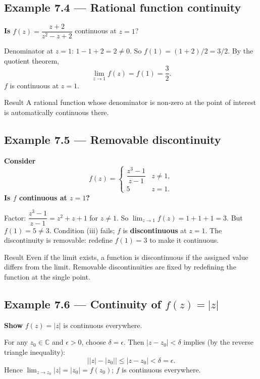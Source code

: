 \documentclass[12pt,a4paper]{article}
\begin{document}
\subsection*{Example 7.4 --- Rational function continuity}

\textbf{Is} $f(z) = \dfrac{z+2}{z^2 - z + 2}$ continuous at $z = 1$?

Denominator at $z = 1$: $1 - 1 + 2 = 2 \neq 0$.  So $f(1) = (1+2)/2 = 3/2$.
By the quotient theorem,
\[
  \lim_{z \to 1} f(z) = f(1) = \frac{3}{2}.
\]
$f$ is continuous at $z = 1$.

\begin{learnbox}{Result}
A rational function whose denominator is non-zero at the point of interest
is automatically continuous there.
\end{learnbox}

\subsection*{Example 7.5 --- Removable discontinuity}

\textbf{Consider}
\[
  f(z) = \begin{cases} \dfrac{z^3 - 1}{z - 1} & z \neq 1, \\ 5 & z = 1. \end{cases}
\]
\textbf{Is $f$ continuous at $z = 1$?}

Factor: $\dfrac{z^3-1}{z-1} = z^2 + z + 1$ for $z \neq 1$.
So $\lim_{z \to 1} f(z) = 1 + 1 + 1 = 3$.
But $f(1) = 5 \neq 3$.  Condition (iii) fails; $f$ is \textbf{discontinuous} at $z = 1$.
The discontinuity is removable: redefine $f(1) = 3$ to make it continuous.

\begin{learnbox}{Result}
Even if the limit exists, a function is discontinuous if the assigned value
differs from the limit.  Removable discontinuities are fixed by redefining
the function at the single point.
\end{learnbox}

\subsection*{Example 7.6 --- Continuity of $f(z) = |z|$}

\textbf{Show} $f(z) = |z|$ is continuous everywhere.

For any $z_0 \in \mathbb{C}$ and $\epsilon > 0$, choose $\delta = \epsilon$.
Then $|z - z_0| < \delta$ implies (by the reverse triangle inequality):
\[
  \bigl||z| - |z_0|\bigr| \leq |z - z_0| < \delta = \epsilon.
\]
Hence $\lim_{z \to z_0}|z| = |z_0| = f(z_0)$; $f$ is continuous everywhere.
\end{document}
